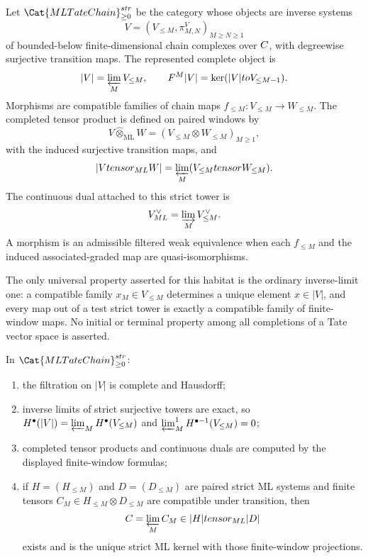 \begin{defn}
\label{defn:strict-ml-tate-habitat}
  Let \(\Cat{MLTateChain}_{\geq0}^{\mathrm{str}}\) be the category whose
  objects are inverse systems
  \[
    V=(V_{\leq M},\pi^V_{M,N})_{M\geq N\geq1}
  \]
  of bounded-below finite-dimensional chain complexes over \(\C\), with
  degreewise surjective transition maps.  The represented complete
  object is
  \[
    |V|=\varprojlim_MV_{\leq M},\qquad
    F^M|V|=\ker(|V|\to V_{\leq M-1}).
  \]
  Morphisms are compatible families of chain maps
  \(f_{\leq M}\colon V_{\leq M}\to W_{\leq M}\).  The completed tensor
  product is defined on paired windows by
  \[
    V\widehat\otimes_{\mathrm{ML}}W
      =
    \left(
      V_{\leq M}\otimes W_{\leq M}
    \right)_{M\geq1},
  \]
  with the induced surjective transition maps, and
  \[
    |V\widehat\otimes_{\mathrm{ML}}W|
      =
    \varprojlim_M(V_{\leq M}\otimes W_{\leq M}).
  \]
  The continuous dual attached to this strict tower is
  \[
    V^\vee_{\mathrm{ML}}=\varinjlim_MV_{\leq M}^\vee .
  \]
  A morphism is an admissible filtered weak equivalence when each
  \(f_{\leq M}\) and the induced associated-graded map are
  quasi-isomorphisms.

  The only universal property asserted for this habitat is the ordinary
  inverse-limit one: a compatible family \(x_M\in V_{\leq M}\) determines
  a unique element \(x\in |V|\), and every map out of a test strict tower
  is exactly a compatible family of finite-window maps.  No initial or
  terminal property among all completions of a Tate vector space is
  asserted.
\end{defn}

\begin{prop}
\label{prop:strict-ml-habitat-exactness}
  In \(\Cat{MLTateChain}_{\geq0}^{\mathrm{str}}\):
  \begin{enumerate}[label=(\roman*)]
    \item the filtration on \(|V|\) is complete and Hausdorff;
    \item inverse limits of strict surjective towers are exact, so
      \(H^\bullet(|V|)=\varprojlim_MH^\bullet(V_{\leq M})\) and
      \(\varprojlim^1_MH^{\bullet-1}(V_{\leq M})=0\);
    \item completed tensor products and continuous duals are computed by
      the displayed finite-window formulas;
    \item if \(H=(H_{\leq M})\) and \(D=(D_{\leq M})\) are paired strict
      ML systems and finite tensors
      \(C_M\in H_{\leq M}\otimes D_{\leq M}\) are compatible under
      transition, then
      \[
        C=\varprojlim_MC_M
          \in |H|\widehat\otimes_{\mathrm{ML}}|D|
      \]
      exists and is the unique strict ML kernel with those finite-window
      projections.
  \end{enumerate}
\end{prop}

